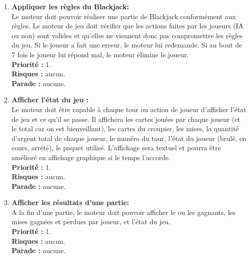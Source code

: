 \documentclass{article}
\begin{document}
\begin{enumerate}

    \item \textbf{Appliquer les règles du Blackjack:} \\
    Le moteur doit pouvoir réaliser une partie de Blackjack conformément aux règles.
    Le moteur de jeu doit vérifier que les actions faites par les joueurs (IA ou non) sont valides et qu'elles ne viennent donc pas compromettre les règles du jeu. Si le joueur a fait une erreur, le moteur lui redemande. Si au bout de 7 fois le joueur lui répond mal, le moteur élimine le joueur. \\
    \textbf{Priorité :} 1. \\
    \textbf{Risques :} aucun. \\
    \textbf{Parade :} aucune.

    \item \textbf{Afficher l'état du jeu :} \\
    Le moteur doit être capable à chaque tour ou action de joueur d'afficher l'état de jeu et ce qu'il se passe. Il affichera les cartes jouées par chaque joueur (et le total car on est bienveillant), les cartes du croupier, les mises, la quantité d'argent total de chaque joueur, le numéro du tour, l'état du joueur (brulé, en cours, arrété), le paquet utilisé. L'affichage sera textuel et pourra être amélioré en affichage graphique si le temps l'accorde. \\
    \textbf{Priorité :} 1. \\
    \textbf{Risques :} aucun. \\
    \textbf{Parade :} aucune.

    \item \textbf{Afficher les résultats d'une partie:} \\
    A la fin d'une partie, le moteur doit pouvoir afficher le ou les gagnants, les mises gagnées et perdues par joueur, et l'état du jeu. \\
    \textbf{Priorité :} 1. \\
    \textbf{Risques :} aucun. \\
    \textbf{Parade :} aucune.


\end{enumerate}
\end{document}
